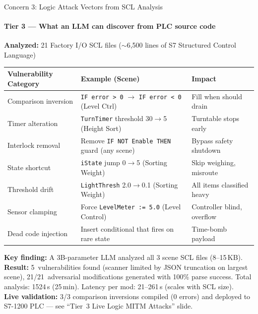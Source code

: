 \documentclass[aspectratio=169,10pt]{beamer}
\begin{document}
\begin{frame}{Concern 3: Logic Attack Vectors from SCL Analysis}
\framesubtitle{Tier 3 — What an LLM can discover from PLC source code}

\textbf{Analyzed:} 21 Factory I/O SCL files ($\sim$6{,}500 lines of S7 Structured Control Language)

\vspace{0.3em}
\begin{table}
\centering
\small
\begin{tabular}{@{}lll@{}}
\toprule
\textbf{Vulnerability Category} & \textbf{Example (Scene)} & \textbf{Impact} \\
\midrule
Comparison inversion & \texttt{IF error > 0} $\rightarrow$ \texttt{IF error < 0} (Level Ctrl) & Fill when should drain \\
Timer alteration & \texttt{TurnTimer} threshold 30$\rightarrow$5 (Height Sort) & Turntable stops early \\
Interlock removal & Remove \texttt{IF NOT Enable THEN} guard (any scene) & Bypass safety shutdown \\
State shortcut & \texttt{iState} jump 0$\rightarrow$5 (Sorting Weight) & Skip weighing, misroute \\
Threshold drift & \texttt{LightThresh} 2.0$\rightarrow$0.1 (Sorting Weight) & All items classified heavy \\
Sensor clamping & Force \texttt{LevelMeter := 5.0} (Level Control) & Controller blind, overflow \\
Dead code injection & Insert conditional that fires on rare state & Time-bomb payload \\
\bottomrule
\end{tabular}
\end{table}

\vspace{0.3em}
\textbf{Key finding:} A 3B-parameter LLM analyzed all 3 scene SCL files (8--15\,KB). \textbf{Result:} 5~vulnerabilities found (scanner limited by JSON truncation on largest scene), 21/21~adversarial modifications generated with 100\% parse success. Total analysis: 1524\,s (25\,min). Latency per mod: 21--261\,s (scales with SCL size).\\
\textbf{Live validation:} 3/3 comparison inversions compiled (0 errors) and deployed to S7-1200 PLC --- see ``Tier~3 Live Logic MITM Attacks'' slide.
\end{frame}
\end{document}
